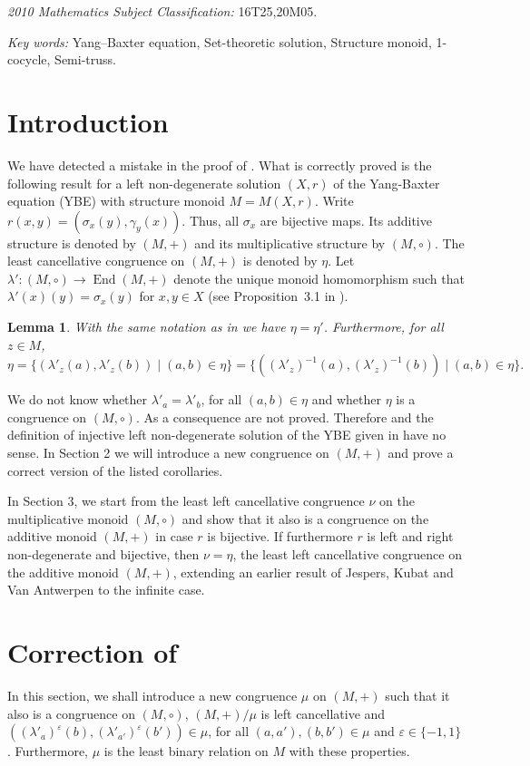 \documentclass[10pt]{article}
\newtheorem{lemma}[theorem]{Lemma}
\newcommand{\End}{\operatorname{End}}
\begin{document}
{\em 2010 Mathematics Subject Classification:} 16T25,20M05.
\bigskip

{\em Key words:} Yang--Baxter equation, Set-theoretic solution,
Structure monoid, 1-cocycle, Semi-truss.
\bigskip

\section{Introduction}
We have detected a mistake in the proof of \cite[Lemma 5.5]{CJV}. What is correctly proved is the following result for a left non-degenerate solution $(X,r)$ of the Yang-Baxter equation (YBE) with structure monoid $M=M(X,r)$.  Write $r(x,y)=(\sigma_x(y), \gamma_y(x))$.
Thus, all $\sigma_x$ are bijective maps.
Its additive structure is denoted by $(M,+)$ and its multiplicative structure  by $(M,\circ)$. The least cancellative congruence on $(M,+)$ is denoted  by $\eta$.
Let  $\lambda'\colon (M,\circ) \rightarrow \End (M,+)$ denote the unique monoid homomorphism such that $\lambda' (x)(y)=\sigma_x (y)$ for $x,y \in X$  (see Proposition~3.1 in \cite{CJV}).

\begin{lemma}\label{eta}
	With the same notation as in \cite[Lemma 5.5]{CJV} we have $\eta=\eta'$. Furthermore, for all $z\in M$,
	$$\eta=\{(\lambda'_z(a),\lambda'_z(b))\mid (a,b)\in \eta\}=\{((\lambda'_z)^{-1}(a),(\lambda'_z)^{-1}(b))\mid (a,b)\in \eta\}.$$  
\end{lemma}

We do not know whether $\lambda'_a=\lambda'_b$, for all $(a,b)\in \eta$ and whether $\eta$ is a congruence on $(M,\circ)$. As a consequence \cite[Remark 5.6, Corollary 5.9 and Corollary 5.10]{CJV} are not proved. Therefore \cite[Question 5.7]{CJV} and the definition of injective left non-degenerate solution of the YBE given in \cite{CJV} have no sense.
In Section 2 we will introduce a new congruence on $(M,+)$ and prove a correct version of the listed corollaries.

In Section 3,  we start from the least left cancellative congruence $\nu$ on the multiplicative  monoid $(M,\circ)$ and show that it also is a congruence on the additive  monoid $(M,+)$ in case $r$ is bijective. If furthermore $r$ is left and right non-degenerate and bijective, then $\nu =\eta$, the least left cancellative congruence on the additive  monoid $(M,+)$, extending an earlier result of Jespers, Kubat and Van Antwerpen to the infinite case.


\section{Correction of \cite[Section 5]{CJV}}
In this section, we shall introduce a new congruence $\mu$ on $(M,+)$ such that it also is a congruence on $(M,\circ)$, $(M,+)/\mu$ is left cancellative and $((\lambda'_a)^{\varepsilon}(b), (\lambda'_{a'})^{\varepsilon}(b'))\in \mu$, for all $(a,a'),(b,b')\in \mu$  and $\varepsilon\in\{ -1,1\}$. Furthermore, $\mu$ is the least binary relation on $M$ with these properties.
\end{document}
